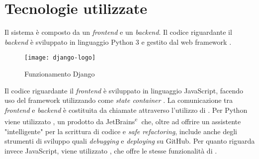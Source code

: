 \section{Tecnologie utilizzate}
Il sistema è composto da un \textit{frontend} e un \textit{backend}. Il codice riguardante il \textit{backend} è sviluppato in linguaggio Python 3 e gestito dal web framework \cite{site:django}.
\begin{figure}[H] 
    \centering
    \texttt{[image: django-logo]} 
    \caption{Funzionamento Django}
    \label{img:django-logo}
\end{figure}
Il codice riguardante il \textit{frontend} è sviluppato in linguaggio JavaScript, facendo uso del framework \cite{prod:react} utilizzando come \textit{state container} \cite{prod:redux}. La comunicazione tra \textit{frontend} e \textit{backend} è costituita da chiamate  attraverso l'utilizzo di \cite{prod:django-rest-framework}. Per Python viene utilizzato \cite{prod:PyCharm}, un  prodotto da JetBrains\textsuperscript{\textcircled{c}} che, oltre ad offrire un assistente "intelligente" per la scrittura di codice e \textit{safe refactoring}, include anche degli strumenti di sviluppo quali \textit{debugging} e \textit{deploying} su GitHub\cite{site:github}. Per quanto riguarda invece JavaScript, viene utilizzato \cite{prod:IntelliJ}, che offre le stesse funzionalità di .

